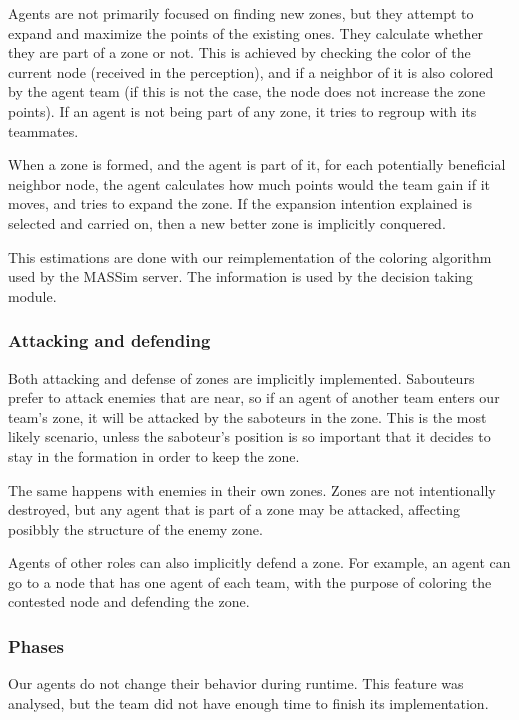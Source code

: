 \documentclass{llncs2e/llncs}
\begin{document}
    Agents are not primarily focused on finding new zones, but they attempt to 
    expand and maximize the points of the existing ones.    
    They calculate whether they are part of a zone or not. This is achieved
    by checking the color of the current node (received in the perception), and if
    a neighbor of it is also colored by the agent team (if this is not the case, the 
    node does not increase the zone points).
    If an agent is not being part of any zone, it tries to regroup with its 
    teammates. 

    When a zone is formed, and the agent is part of it, for each potentially 
    beneficial neighbor node, the agent calculates how much points would the team 
    gain if it moves, and tries to expand the zone.
    If the expansion intention explained is selected and carried on, then a new 
    better zone is implicitly conquered.
    
    This estimations are done with our reimplementation of the coloring algorithm used 
    by the MASSim server. The information is used by the decision taking module.  

\subsubsection{Attacking and defending}
    
    Both attacking and defense of zones are implicitly implemented. 
    Sabouteurs prefer to attack enemies that are near, so if an agent of another 
    team enters our team's zone, it will be attacked by the saboteurs in the zone.
    This is the most likely scenario, unless the saboteur's position is so 
    important that it decides to stay in the formation in order to keep the zone.

    The same happens with enemies in their own zones. Zones are not intentionally 
    destroyed, but any agent that is part of a zone may be attacked, affecting 
    posibbly the structure of the enemy zone.
    
    Agents of other roles can also implicitly defend a zone. For example, an agent 
    can go to a node that has one agent of each team, with the purpose of coloring the 
    contested node and defending the zone.
    
\subsubsection{Phases}

    Our agents do not change their behavior during runtime. This feature was 
    analysed, but the team did not have enough time to finish its implementation.
    
\end{document}
